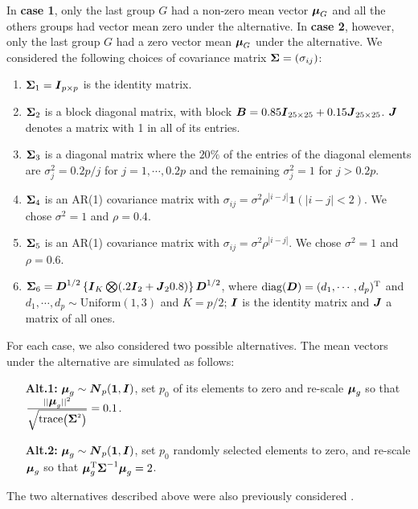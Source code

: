 \documentclass[times,sort&compress,3p]{elsarticle}
\theoremstyle{plain}%
\theoremstyle{definition}
\def\diag{\hbox{diag}}
\def\diag{\hbox{diag}}
\def\trace{\hbox{trace}}
\def\diag{\hbox{diag}}
\def\diag{\hbox{diag}}
\def\trace{\hbox{trace}}
\def\trans{^{\rm T}}
\def\bone{{\mathbf 1}}
\newcommand{\uB}       {\mbox{\boldmath$B$}}
\newcommand{\uD}       {\mbox{\boldmath$D$}}
\newcommand{\uI}       {\mbox{\boldmath$I$}}
\newcommand{\uJ}       {\mbox{\boldmath$J$}}
\newcommand{\uN}       {\mbox{\boldmath$N$}}
\newcommand{\umu}               {\mbox{\boldmath$\mu$}}
\newcommand{\uSigma}            {\mbox{\boldmath$\Sigma$}}
\begin{document}
In \textbf{case 1}, only the last group $G$ had a non-zero mean vector $\umu_G$ and all the others groups had vector mean zero under the alternative. In \textbf{case 2}, however, only the last group $G$ had a zero vector mean $\umu_{G}$ under the alternative.
We considered the following choices of covariance matrix $\uSigma=(\sigma_{ij})$:
\begin{enumerate}
  \item $\uSigma_{1} = \uI_{p \times p} $ is the identity matrix.
  \item $\uSigma_{2} $ is a block diagonal matrix, with block $\uB = 0.85\uI_{25 \times 25} + 0.15\uJ_{25 \times 25}$. $\uJ$ denotes a matrix with 1 in all of its entries.
  \item $\uSigma_{3}$ is a diagonal matrix where the $20\%$ of the entries of the diagonal elements are $\sigma^2_j = 0.2p/j$ for $j = 1, \cdots, 0.2p$ and the remaining $\sigma^2_j = 1$ for $j > 0.2p$.
  \item $\uSigma_4$ is an AR(1) covariance matrix with $\sigma_{ij}=\sigma^2\rho^{|i - j|}\bone(|i-j| < 2)$. We chose $\sigma^2 = 1$ and $\rho = 0.4$.
  \item $\uSigma_{5}$ is an AR(1) covariance matrix with $\sigma_{ij}=\sigma^2\rho^{|i - j|}$. We chose $\sigma^2 = 1$ and $\rho = 0.6$.
  \item $\uSigma_6 = \uD^{1/2}\left\{ \uI_K \bigotimes (.2\uI_2 + \uJ_{2}0.8) \right\}\uD^{1/2}$, where $\diag(\uD)=(d_{1}, \cdots, d_{p})\trans$ and $d_{1}, \cdots, d_{p} \sim \text{Uniform}(1, 3)$ and $K = p/2$; $\uI$ is the identity matrix and $\uJ$ a matrix of all ones.
\end{enumerate}
For each case, we also considered two possible alternatives. The mean vectors under the alternative are simulated as follows:
\begin{enumerate} %
  \item[{\bf Alt.1:}] $\umu_g \sim \uN_{p}(\bf{1}, \uI)$, set $p_0$ of its elements to zero and re-scale $\umu_g$ so that $\frac{||\umu_{g}||^{2}}{\sqrt{\trace\left( \uSigma ^{2}\right)}} = 0.1$.
   \item[{\bf Alt.2:}]  $\umu_g \sim \uN_{p}(\bf{1}, \uI)$, set $p_0$ randomly selected elements to zero, and re-scale $\umu_g$ so that $\umu_g \trans\uSigma ^{-1}  \umu_g = 2$.
\end{enumerate}
The two alternatives described above were also previously considered \cite{srivastava2014raptt,zoh2018powerful}.
\end{document}
